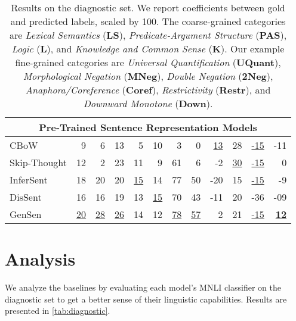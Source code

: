 \documentclass{article} \usepackage{iclr2019_conference,times}
\begin{document}
\begin{table*}[t]
\begin{tabular}{lr@{\hskip 3em}rrrr@{\hskip 3em}rrrrrr}
\midrule
\multicolumn{12}{c}{Pre-Trained Sentence Representation Models} \\
\midrule
CBoW & 9 & 6 & 13 & 5 & 10 & 3 & 0 & \underline{13} & 28 & \underline{-15} & -11 \\
Skip-Thought & 12 & 2 & 23 & 11 & 9 & 61 & 6 & -2 & \underline{30} & \underline{-15} & 0 \\
InferSent & 18 & 20 & 20 & \underline{15} & 14 & 77 & 50 & -20 & 15 & \underline{-15} & -9 \\
DisSent & 16 & 16 & 19 & 13 & \underline{15} & 70 & 43 & -11 & 20 & -36 & -09 \\
GenSen & \underline{20} & \underline{28} & \underline{26} & 14 & 12 & \underline{78} & \underline{57} & 2 & 21 & \underline{-15} & \textbf{\underline{12}} \\
\bottomrule
\end{tabular}
\caption{Results on the diagnostic set. We report  coefficients between gold and predicted labels, scaled by 100.
The coarse-grained categories are \textit{Lexical Semantics} (\textbf{LS}),
\textit{Predicate-Argument Structure} (\textbf{PAS}),
\textit{Logic} (\textbf{L}),
and \textit{Knowledge and Common Sense} (\textbf{K}). Our example fine-grained categories are \textit{Universal Quantification} (\textbf{UQuant}),
\textit{Morphological Negation} (\textbf{MNeg}),
\textit{Double Negation} (\textbf{2Neg}),
\textit{Anaphora/Coreference} (\textbf{Coref}), \textit{Restrictivity} (\textbf{Restr}), and \textit{Downward Monotone} (\textbf{Down}).}
\label{tab:diagnostic}
\end{table*}





\section{Analysis}

We analyze the baselines by evaluating each model's MNLI classifier on the diagnostic set to get a better sense of their linguistic capabilities.
Results are presented in \autoref{tab:diagnostic}.
\end{document}
